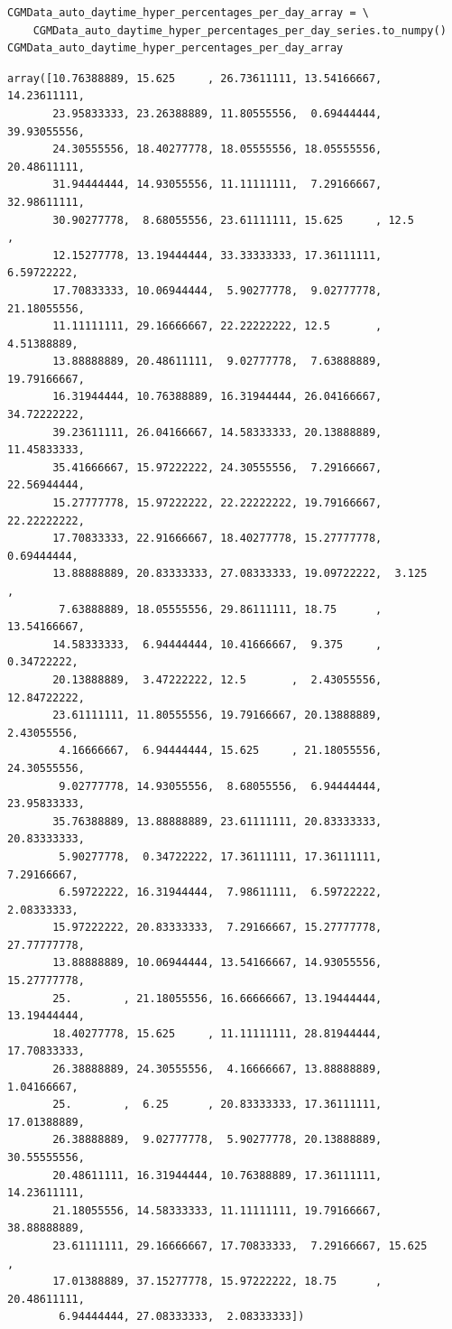 \begin{verbatim}
CGMData_auto_daytime_hyper_percentages_per_day_array = \
    CGMData_auto_daytime_hyper_percentages_per_day_series.to_numpy()
CGMData_auto_daytime_hyper_percentages_per_day_array
\end{verbatim}

\begin{verbatim}
array([10.76388889, 15.625     , 26.73611111, 13.54166667, 14.23611111,
       23.95833333, 23.26388889, 11.80555556,  0.69444444, 39.93055556,
       24.30555556, 18.40277778, 18.05555556, 18.05555556, 20.48611111,
       31.94444444, 14.93055556, 11.11111111,  7.29166667, 32.98611111,
       30.90277778,  8.68055556, 23.61111111, 15.625     , 12.5       ,
       12.15277778, 13.19444444, 33.33333333, 17.36111111,  6.59722222,
       17.70833333, 10.06944444,  5.90277778,  9.02777778, 21.18055556,
       11.11111111, 29.16666667, 22.22222222, 12.5       ,  4.51388889,
       13.88888889, 20.48611111,  9.02777778,  7.63888889, 19.79166667,
       16.31944444, 10.76388889, 16.31944444, 26.04166667, 34.72222222,
       39.23611111, 26.04166667, 14.58333333, 20.13888889, 11.45833333,
       35.41666667, 15.97222222, 24.30555556,  7.29166667, 22.56944444,
       15.27777778, 15.97222222, 22.22222222, 19.79166667, 22.22222222,
       17.70833333, 22.91666667, 18.40277778, 15.27777778,  0.69444444,
       13.88888889, 20.83333333, 27.08333333, 19.09722222,  3.125     ,
        7.63888889, 18.05555556, 29.86111111, 18.75      , 13.54166667,
       14.58333333,  6.94444444, 10.41666667,  9.375     ,  0.34722222,
       20.13888889,  3.47222222, 12.5       ,  2.43055556, 12.84722222,
       23.61111111, 11.80555556, 19.79166667, 20.13888889,  2.43055556,
        4.16666667,  6.94444444, 15.625     , 21.18055556, 24.30555556,
        9.02777778, 14.93055556,  8.68055556,  6.94444444, 23.95833333,
       35.76388889, 13.88888889, 23.61111111, 20.83333333, 20.83333333,
        5.90277778,  0.34722222, 17.36111111, 17.36111111,  7.29166667,
        6.59722222, 16.31944444,  7.98611111,  6.59722222,  2.08333333,
       15.97222222, 20.83333333,  7.29166667, 15.27777778, 27.77777778,
       13.88888889, 10.06944444, 13.54166667, 14.93055556, 15.27777778,
       25.        , 21.18055556, 16.66666667, 13.19444444, 13.19444444,
       18.40277778, 15.625     , 11.11111111, 28.81944444, 17.70833333,
       26.38888889, 24.30555556,  4.16666667, 13.88888889,  1.04166667,
       25.        ,  6.25      , 20.83333333, 17.36111111, 17.01388889,
       26.38888889,  9.02777778,  5.90277778, 20.13888889, 30.55555556,
       20.48611111, 16.31944444, 10.76388889, 17.36111111, 14.23611111,
       21.18055556, 14.58333333, 11.11111111, 19.79166667, 38.88888889,
       23.61111111, 29.16666667, 17.70833333,  7.29166667, 15.625     ,
       17.01388889, 37.15277778, 15.97222222, 18.75      , 20.48611111,
        6.94444444, 27.08333333,  2.08333333])
\end{verbatim}

